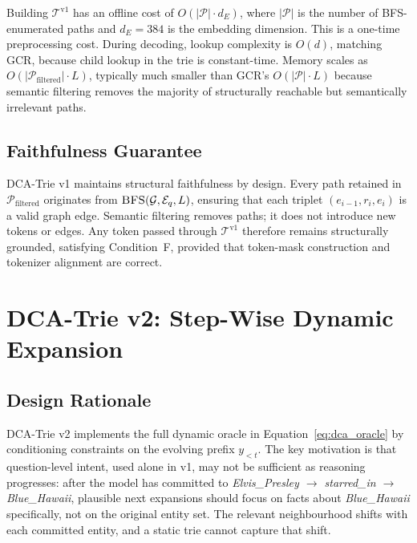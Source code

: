 Building $\mathcal{T}^{\text{v1}}$ has an offline cost of $O(|\mathcal{P}| \cdot d_E)$, where $|\mathcal{P}|$ is the number of BFS-enumerated paths and $d_E = 384$ is the embedding dimension. This is a one-time preprocessing cost. During decoding, lookup complexity is $O(d)$, matching GCR, because child lookup in the trie is constant-time. Memory scales as $O(|\mathcal{P}_{\text{filtered}}| \cdot L)$, typically much smaller than GCR's $O(|\mathcal{P}| \cdot L)$ because semantic filtering removes the majority of structurally reachable but semantically irrelevant paths.

\subsection{Faithfulness Guarantee}

DCA-Trie v1 maintains structural faithfulness by design. Every path retained in $\mathcal{P}_{\text{filtered}}$ originates from $\textsc{BFS}(\mathcal{G}, \mathcal{E}_q, L)$, ensuring that each triplet $(e_{i-1}, r_i, e_i)$ is a valid graph edge. Semantic filtering removes paths; it does not introduce new tokens or edges. Any token passed through $\mathcal{T}^{\text{v1}}$ therefore remains structurally grounded, satisfying Condition~F, provided that token-mask construction and tokenizer alignment are correct.

\section{DCA-Trie v2: Step-Wise Dynamic Expansion}
\label{sec:ch3v2}

\subsection{Design Rationale}

DCA-Trie v2 implements the full dynamic oracle in Equation~\eqref{eq:dca_oracle} by conditioning constraints on the evolving prefix $y_{<t}$. The key motivation is that question-level intent, used alone in v1, may not be sufficient as reasoning progresses: after the model has committed to \textit{Elvis\_Presley $\to$ starred\_in $\to$ Blue\_Hawaii}, plausible next expansions should focus on facts about \textit{Blue\_Hawaii} specifically, not on the original entity set. The relevant neighbourhood shifts with each committed entity, and a static trie cannot capture that shift.

